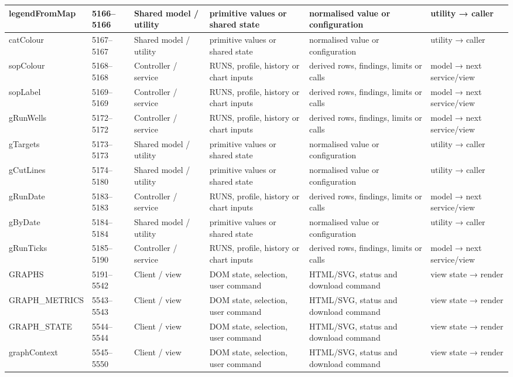 \begin{landscape}
\begin{longtable}{@{}p{3.2cm}p{1.45cm}p{2.7cm}p{4.0cm}p{4.0cm}p{3.0cm}@{}}
legendFromMap & 5166--5166 & Shared model / utility & primitive values or shared state & normalised value or configuration & utility → caller \\\hline
catColour & 5167--5167 & Shared model / utility & primitive values or shared state & normalised value or configuration & utility → caller \\\hline
sopColour & 5168--5168 & Controller / service & RUNS, profile, history or chart inputs & derived rows, findings, limits or calls & model → next service/view \\\hline
sopLabel & 5169--5169 & Controller / service & RUNS, profile, history or chart inputs & derived rows, findings, limits or calls & model → next service/view \\\hline
gRunWells & 5172--5172 & Controller / service & RUNS, profile, history or chart inputs & derived rows, findings, limits or calls & model → next service/view \\\hline
gTargets & 5173--5173 & Shared model / utility & primitive values or shared state & normalised value or configuration & utility → caller \\\hline
gCutLines & 5174--5180 & Shared model / utility & primitive values or shared state & normalised value or configuration & utility → caller \\\hline
gRunDate & 5183--5183 & Controller / service & RUNS, profile, history or chart inputs & derived rows, findings, limits or calls & model → next service/view \\\hline
gByDate & 5184--5184 & Shared model / utility & primitive values or shared state & normalised value or configuration & utility → caller \\\hline
gRunTicks & 5185--5190 & Controller / service & RUNS, profile, history or chart inputs & derived rows, findings, limits or calls & model → next service/view \\\hline
GRAPHS & 5191--5542 & Client / view & DOM state, selection, user command & HTML/SVG, status and download command & view state → render \\\hline
GRAPH\_METRICS & 5543--5543 & Client / view & DOM state, selection, user command & HTML/SVG, status and download command & view state → render \\\hline
GRAPH\_STATE & 5544--5544 & Client / view & DOM state, selection, user command & HTML/SVG, status and download command & view state → render \\\hline
graphContext & 5545--5550 & Client / view & DOM state, selection, user command & HTML/SVG, status and download command & view state → render \\\hline

\end{longtable}
\end{landscape}
